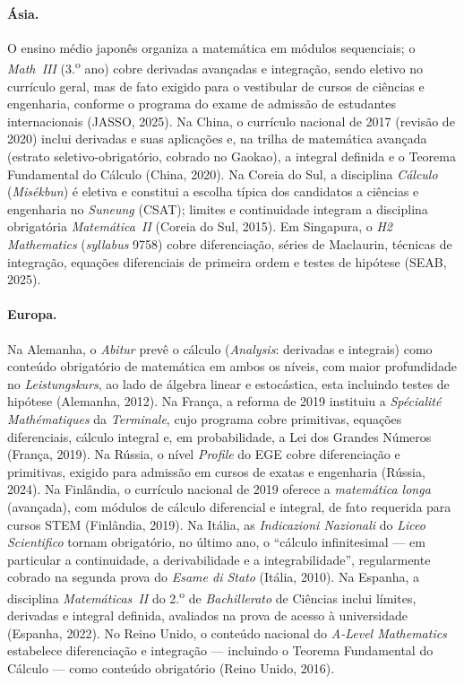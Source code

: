\documentclass[12pt,a4paper,oneside]{article}
\begin{document}
\paragraph{Ásia.} O ensino médio japonês organiza a matemática em módulos
sequenciais; o \emph{Math~III} (3.\textsuperscript{o} ano) cobre
derivadas avançadas e integração, sendo eletivo no currículo geral, mas
de fato exigido para o vestibular de cursos de ciências e engenharia,
conforme o programa do exame de admissão de estudantes internacionais
(JASSO, 2025). Na China, o currículo nacional de 2017 (revisão de 2020)
inclui derivadas e suas aplicações e, na trilha de matemática avançada
(estrato seletivo-obrigatório, cobrado no Gaokao), a integral definida e
o Teorema Fundamental do Cálculo (China, 2020). Na Coreia do Sul, a
disciplina \emph{Cálculo} (\emph{Misékbun}) é eletiva e constitui a
escolha típica dos candidatos a ciências e engenharia no \emph{Suneung}
(CSAT); limites e continuidade integram a disciplina obrigatória
\emph{Matemática~II} (Coreia do Sul, 2015). Em Singapura, o \emph{H2
Mathematics} (\emph{syllabus} 9758) cobre diferenciação, séries de
Maclaurin, técnicas de integração, equações diferenciais de primeira
ordem e testes de hipótese (SEAB, 2025).

\paragraph{Europa.} Na Alemanha, o \emph{Abitur} prevê o cálculo
(\emph{Analysis}: derivadas e integrais) como conteúdo obrigatório de
matemática em ambos os níveis, com maior profundidade no
\emph{Leistungskurs}, ao lado de álgebra linear e estocástica, esta
incluindo testes de hipótese (Alemanha, 2012). Na França, a reforma de
2019 instituiu a \emph{Spécialité Mathématiques} da \emph{Terminale}, cujo
programa cobre primitivas, equações diferenciais, cálculo integral e, em
probabilidade, a Lei dos Grandes Números (França, 2019). Na Rússia, o
nível \emph{Profile} do EGE cobre diferenciação e primitivas, exigido
para admissão em cursos de exatas e engenharia (Rússia, 2024). Na
Finlândia, o currículo nacional de 2019 oferece a \emph{matemática longa}
(avançada), com módulos de cálculo diferencial e integral, de fato
requerida para cursos STEM (Finlândia, 2019). Na Itália, as
\emph{Indicazioni Nazionali} do \emph{Liceo Scientifico} tornam
obrigatório, no último ano, o ``cálculo infinitesimal --- em particular a
continuidade, a derivabilidade e a integrabilidade'', regularmente
cobrado na segunda prova do \emph{Esame di Stato} (Itália, 2010). Na
Espanha, a disciplina \emph{Matemáticas~II} do 2.\textsuperscript{o} de
\emph{Bachillerato} de Ciências inclui límites, derivadas e integral
definida, avaliados na prova de acesso à universidade (Espanha, 2022). No
Reino Unido, o conteúdo nacional do \emph{A-Level Mathematics} estabelece
diferenciação e integração --- incluindo o Teorema Fundamental do Cálculo
--- como conteúdo obrigatório (Reino Unido, 2016).
\end{document}
